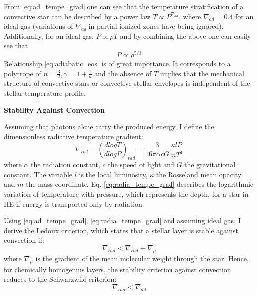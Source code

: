 From \cref{eq:ad_tempe_grad} one can see that the temperature stratification of a convective star can be described by a power law $T \propto P^{\nabla_{ad}}$, where $\nabla_{ad} = 0.4$ for an ideal gas \citep{pols2011stellar} (variations of $\nabla_{ad}$ in partial ionized zones have being ignored). Additionally, for an ideal gas, $P \propto \rho T$ and by combining the above one can easily see that
\begin{equation}\label{eq:adiabatic_eos}
    P \propto \rho^{5/3}
\end{equation}
Relationship \cref{eq:adiabatic_eos} is of great importance. It corresponds to a polytrope of $n = \frac{3}{2}, \gamma = 1+ \frac{1}{n}$ and the absence of $T$ implies that the mechanical structure of convective stars or convective stellar envelopes is independent of the stellar temperature profile. 

{\bf Stability Against Convection}

Assuming that photons alone carry the produced energy, I define the dimensionless radiative temperature gradient:
\begin{equation}\label{eq:radia_tempe_grad}
    \nabla_{rad} = \left ( \frac{d logT}{d logP} \right)_{rad} = \frac{3}{16 \pi \alpha c G} \frac{\kappa l P}{m T^4}
\end{equation}
where $\alpha$ the radiation constant, $c$ the speed of light and $G$ the gravitational constant. The variable $l$ is the local luminosity, $\kappa$ the Rosseland mean opacity and $m$ the mass coordinate. Eq. \eqref{eq:radia_tempe_grad} describes the logarithmic variation of temperature with pressure, which represents the depth, for a star in HE if energy is transported only by radiation.

Using \eqref{eq:ad_tempe_grad}, \eqref{eq:radia_tempe_grad}  and assuming ideal gas, I derive the  Ledoux criterion,  which states that a stellar layer is stable against convection if:
\begin{equation}\label{eq:Ledoux_criterion}
    \nabla_{rad} < \nabla_{rad} +  \nabla_{\mu}
\end{equation}
where $\nabla_{\mu}$ is the gradient of the mean molecular weight through the star. Hence, for chemically homogenius layers, the stability criterion against convection reduces to the Schwarzwild criterion:
\begin{equation}\label{eq:Schwarzwild_criterion}
    \nabla_{rad} < \nabla_{ad}
\end{equation}

